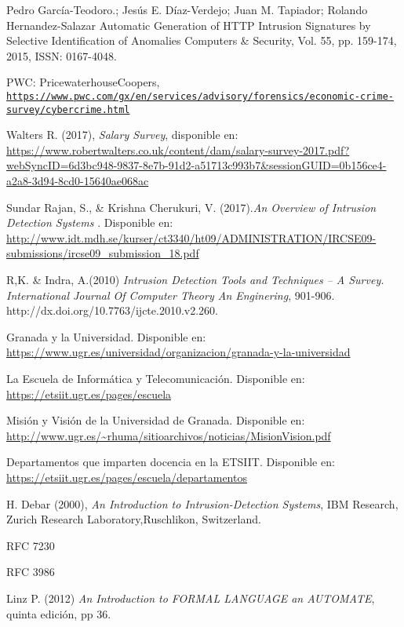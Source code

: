 \begin{thebibliography}{99}

Pedro García-Teodoro.; Jesús E. Díaz-Verdejo; Juan M. Tapiador; Rolando Hernandez-Salazar
Automatic Generation of HTTP Intrusion Signatures by Selective Identification of Anomalies
Computers \& Security, Vol. 55, pp. 159-174, 2015, ISSN: 0167-4048.

PWC: PricewaterhouseCoopers,
\\\texttt{\url{https://www.pwc.com/gx/en/services/advisory/forensics/economic-crime-survey/cybercrime.html}}

Walters R. (2017), \textit{Salary Survey}, disponible en: \url{https://www.robertwalters.co.uk/content/dam/salary-survey-2017.pdf?webSyncID=6d3bc948-9837-8e7b-91d2-a51713c993b7&sessionGUID=0b156ce4-a2a8-3d94-8cd0-15640ae068ac}

 Sundar Rajan, S., \& Krishna Cherukuri, V. (2017).\textit{An Overview of Intrusion Detection Systems }. Disponible en: \url{http://www.idt.mdh.se/kurser/ct3340/ht09/ADMINISTRATION/IRCSE09-submissions/ircse09_submission_18.pdf}

 R,K. \& Indra, A.(2010) \textit{Intrusion Detection Tools and Techniques --
A Survey. International Journal Of Computer Theory An Enginering}, 901-906. http://dx.doi.org/10.7763/ijcte.2010.v2.260.

 Granada y la Universidad. Disponible en: \url{https://www.ugr.es/universidad/organizacion/granada-y-la-universidad}

 La Escuela de Informática y Telecomunicación. Disponible en: \url{https://etsiit.ugr.es/pages/escuela}

 Misión y Visión de la Universidad de Granada. Disponible en: \url{http://www.ugr.es/~rhuma/sitioarchivos/noticias/MisionVision.pdf}

 Departamentos que imparten docencia en la ETSIIT. Disponible en: \url{https://etsiit.ugr.es/pages/escuela/departamentos}

H.   Debar (2000), \textit{An Introduction to Intrusion-Detection Systems},  IBM   Research,   Zurich   Research   Laboratory,Ruschlikon, Switzerland.

RFC 7230

RFC 3986

Linz P. (2012) \textit{An Introduction to FORMAL LANGUAGE an AUTOMATE}, quinta edición, pp 36.


\end{thebibliography}
